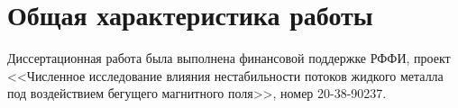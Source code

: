 \section*{Общая характеристика работы}

\newcommand{\actuality}{\pdfbookmark[1]{Актуальность}{actuality}\underline{\textbf{\actualityTXT}}}

\newcommand{\progress}{\pdfbookmark[1]{Разработанность темы}{progress}\underline{\textbf{\progressTXT}}}

\newcommand{\aim}{\pdfbookmark[1]{Цели}{aim}\underline{{\textbf\aimTXT}}}

\newcommand{\tasks}{\pdfbookmark[1]{Задачи}{tasks}\underline{\textbf{\tasksTXT}}}
\newcommand{\aimtasks}{\pdfbookmark[1]{Цели и задачи}{aimtasks}\aimtasksTXT}
\newcommand{\novelty}{\pdfbookmark[1]{Научная новизна}{novelty}\underline{\textbf{\noveltyTXT}}}
\newcommand{\influence}{\pdfbookmark[1]{Практическая значимость}{influence}\underline{\textbf{\influenceTXT}}}
\newcommand{\methods}{\pdfbookmark[1]{Методология и методы исследования}{methods}\underline{\textbf{\methodsTXT}}}
\newcommand{\defpositions}{\pdfbookmark[1]{Положения, выносимые на защиту}{defpositions}\underline{\textbf{\defpositionsTXT}}}
\newcommand{\reliability}{\pdfbookmark[1]{Достоверность}{reliability}\underline{\textbf{\reliabilityTXT}}}
\newcommand{\probation}{\pdfbookmark[1]{Апробация}{probation}\underline{\textbf{\probationTXT}}}
\newcommand{\contribution}{\pdfbookmark[1]{Личный вклад}{contribution}\underline{\textbf{\contributionTXT}}}
\newcommand{\publications}{\pdfbookmark[1]{Публикации}{publications}\underline{\textbf{\publicationsTXT}}}


Диссертационная работа была выполнена финансовой поддержке РФФИ, проект <<Численное исследование влияния нестабильности потоков жидкого металла под воздействием бегущего магнитного поля>>, номер 20-38-90237.


